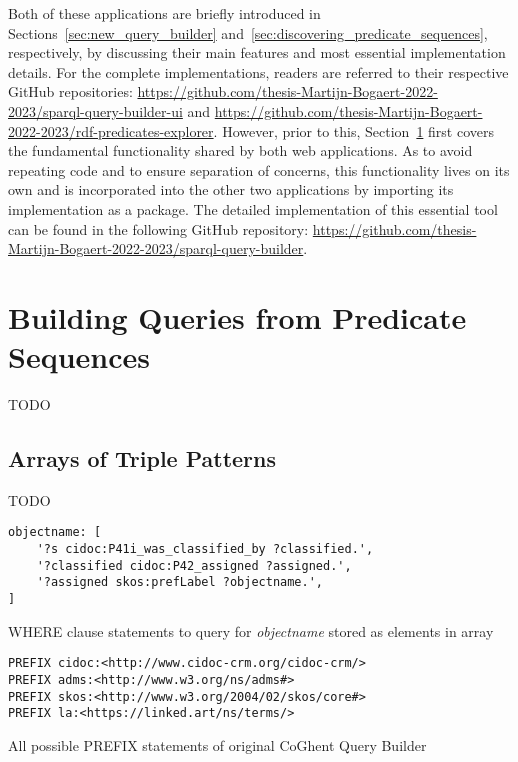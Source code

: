 Both of these applications are briefly introduced in Sections~\ref{sec:new_query_builder} and~\ref{sec:discovering_predicate_sequences}, respectively, by discussing their main features and most essential implementation details. For the complete implementations, readers are referred to their respective GitHub repositories: \url{https://github.com/thesis-Martijn-Bogaert-2022-2023/sparql-query-builder-ui} and \url{https://github.com/thesis-Martijn-Bogaert-2022-2023/rdf-predicates-explorer}. However, prior to this, Section~\ref{sec:building_queries_predicate_sequences} first covers the fundamental functionality shared by both web applications. As to avoid repeating code and to ensure separation of concerns, this functionality lives on its own and is incorporated into the other two applications by importing its implementation as a package. The detailed implementation of this essential tool can be found in the following GitHub repository: \url{https://github.com/thesis-Martijn-Bogaert-2022-2023/sparql-query-builder}.

\section{Building Queries from Predicate Sequences}
\label{sec:building_queries_predicate_sequences}

TODO

\subsection{Arrays of Triple Patterns}

TODO

%
\begin{listing}[htbp]
    \begin{verbatim}
objectname: [
    '?s cidoc:P41i_was_classified_by ?classified.',
    '?classified cidoc:P42_assigned ?assigned.',
    '?assigned skos:prefLabel ?objectname.',
]
    \end{verbatim}
    \caption{WHERE clause statements to query for \textit{objectname} stored as elements in array}
    \label{lst:where_statements_array}
\end{listing}
%
\begin{listing}[htbp]
    \begin{verbatim}
PREFIX cidoc:<http://www.cidoc-crm.org/cidoc-crm/>
PREFIX adms:<http://www.w3.org/ns/adms#>
PREFIX skos:<http://www.w3.org/2004/02/skos/core#>
PREFIX la:<https://linked.art/ns/terms/>
    \end{verbatim}
    \caption{All possible PREFIX statements of original CoGhent Query Builder}
    \label{lst:prefix_statements_original}
\end{listing}
%

